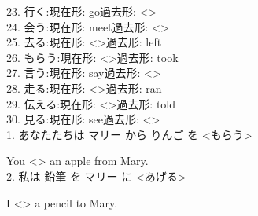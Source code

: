 \documentclass[uplatex,
paper=a4,
fontsize=18pt,
jafontsize=16pt,
number_of_lines=30,
line_length=30zh,
baselineskip=25pt,
]{jlreq}
\begin{document}
23.  行く:\hspace{2em}現在形: go\hspace{2em}過去形: <\hspace{3em}>
\\

24.  会う:\hspace{2em}現在形: meet\hspace{2em}過去形: <\hspace{3em}>
\\

25.  去る:\hspace{2em}現在形: <\hspace{3em}>\hspace{2em}過去形: left
\\

26.  もらう:\hspace{2em}現在形: <\hspace{3em}>\hspace{2em}過去形: took
\\

27.  言う:\hspace{2em}現在形: say\hspace{2em}過去形: <\hspace{3em}>
\\

28.  走る:\hspace{2em}現在形: <\hspace{3em}>\hspace{2em}過去形: ran
\\

29.  伝える:\hspace{2em}現在形: <\hspace{3em}>\hspace{2em}過去形: told
\\

30.  見る:\hspace{2em}現在形: see\hspace{2em}過去形: <\hspace{3em}>
\\


\newpage
{}
1.  あなたたちは マリー から りんご を <もらう>

  You <\hspace{3em}> an apple from Mary.
\\

2.  私は 鉛筆 を マリー に <あげる>

  I <\hspace{3em}> a pencil to Mary.
\\
\end{document}
